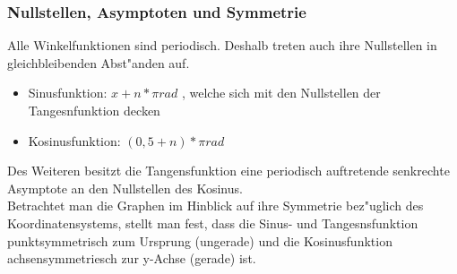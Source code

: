 \subsubsection{Nullstellen, Asymptoten und Symmetrie}
Alle Winkelfunktionen sind periodisch. Deshalb treten auch ihre Nullstellen in gleichbleibenden Abst"anden auf.
\begin{itemize}
\item Sinusfunktion: $x+n*\pi rad$ , welche sich mit den Nullstellen der Tangesnfunktion decken
\item Kosinusfunktion: $(0,5+n)*\pi rad$
\end{itemize}
Des Weiteren besitzt die Tangensfunktion eine periodisch auftretende senkrechte Asymptote an den Nullstellen des Kosinus.\\
Betrachtet man die Graphen im Hinblick auf ihre Symmetrie bez"uglich des Koordinatensystems, stellt man fest, dass die Sinus- und Tangesnsfunktion punktsymmetrisch zum Ursprung (ungerade) und die Kosinusfunktion achsensymmetriesch zur y-Achse (gerade) ist.
